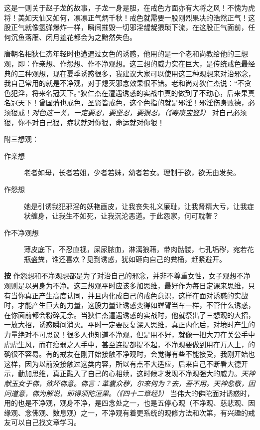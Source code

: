 这是一则关于赵子龙的故事，子龙一身是胆，在戒色方面亦有大将之风！不愧为虎将！美如天仙又如何，凛凛正气炳千秋！戒色就需要一股刚烈果决的浩然正气！这股正气就像氢弹爆炸一样，瞬间摧毁一切邪淫龌龊猥琐下流，在这股正气面前，任何沉鱼落雁、闭月羞花都会为之黯然失色。

唐朝名相狄仁杰年轻时也遭遇过女色的诱惑，他用的是一个老和尚教给他的三想观，即：作亲想、作怨想、作不净观想。这三想的威力实在巨大，是传统戒色最经典的三种观想，现在夏季诱惑很多，我建议大家可以使用这三种观想来对治邪念，我自己常用的就是不净观，对于熄灭邪念效果很不错。老和尚对狄仁杰说：“不贪色犯淫，将来名冠天下。”狄仁杰在遭遇诱惑的实战中真的做到了不动心，后来果真名冠天下！曾国藩也戒色，圣贤皆戒色，这个色指的就是邪淫！邪淫伤身败德，必须狠戒！\textit{对色这一关，一定要忍，要坚忍，要狠忍。（《寿康宝鉴》）} 对自己必须狠，你不对自己狠，症状就对你狠，命运就对你狠！

附三想观：

\begin{description}
    \item[作亲想] 老者如母，长者若姐，少者若妹，幼者若女。理制于欲，欲无由发矣。
    \item[作怨想] 她是引诱我犯邪淫的妖艳画皮，让我丧失礼义廉耻，让我肾精大亏，让我症状缠身，让我生不如死，让我沉沦恶道。于此怨家，何可耽著？
    \item[作不净观想] 薄皮底下，不忍直视，屎尿脓血，淋漓狼藉，带肉骷髅，七孔垢秽，宛若花瓶盛粪，谁还喜欢？见到诱惑，犹如砸向自己的粪桶，赶紧避开。
\end{description}

\textbf{按} 作怨想和不净观想都是为了对治自己的邪念，并非不尊重女性，女子观想不净观则是以男身为不净。这三想观平时应该多加思维，最好作为每日定课来思维，只有当你真正产生高度认同，并且内化成自己的戒色意识，这样在面对诱惑的实战时，才能产生巨大的力量，这股力量让诱惑变得如螳臂当车一样，不管什么诱惑，在你面前都会粉碎无余。当狄仁杰遭遇诱惑的实战时，他就祭出了三想观的大招，一放大招，诱惑瞬间消灭。平时一定要反复深入思维，真正内化后，对境时产生的力量绝对不可思议！很多人也知道不净观，但是用不好，就像一把大刀在关公手中虎虎生风，而在瘦弱之人手中，甚至连提都提不起，不净观要做到用在万人上，的确很不容易。有的戒友在刚开始接触不净观时，会觉得有些不能接受，我刚开始也这样，因为以前没接触过这类内容，所以有点不大适应，后来自己不断看大德开示，勤加思维，真正融入了自己的心相续，这时候才发现不净观强大的威力。\textit{天神献玉女于佛，欲坏佛意。佛言：革囊众秽，尔来何为？去，吾不用。天神愈敬，因问道意，佛为解说，即得须陀洹果。（《四十二章经》）} 当伟大的佛陀面对诱惑时，用的也是不净观，观身不净，是四念处之一，也是五停心观（不净观、慈悲观、因缘观、念佛观、数息观）之一，不净观有着更系统的观修方法和次第，有兴趣的戒友可以自己找文章学习。

